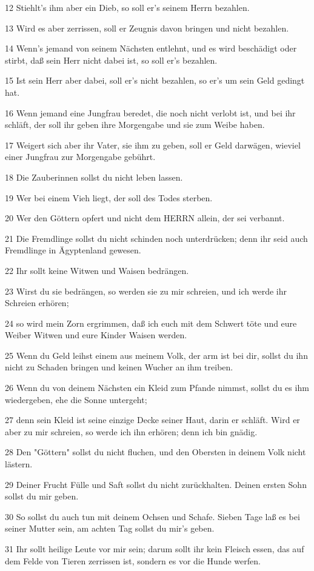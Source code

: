 \par 12 Stiehlt's ihm aber ein Dieb, so soll er's seinem Herrn bezahlen.
\par 13 Wird es aber zerrissen, soll er Zeugnis davon bringen und nicht bezahlen.
\par 14 Wenn's jemand von seinem Nächsten entlehnt, und es wird beschädigt oder stirbt, daß sein Herr nicht dabei ist, so soll er's bezahlen.
\par 15 Ist sein Herr aber dabei, soll er's nicht bezahlen, so er's um sein Geld gedingt hat.
\par 16 Wenn jemand eine Jungfrau beredet, die noch nicht verlobt ist, und bei ihr schläft, der soll ihr geben ihre Morgengabe und sie zum Weibe haben.
\par 17 Weigert sich aber ihr Vater, sie ihm zu geben, soll er Geld darwägen, wieviel einer Jungfrau zur Morgengabe gebührt.
\par 18 Die Zauberinnen sollst du nicht leben lassen.
\par 19 Wer bei einem Vieh liegt, der soll des Todes sterben.
\par 20 Wer den Göttern opfert und nicht dem HERRN allein, der sei verbannt.
\par 21 Die Fremdlinge sollst du nicht schinden noch unterdrücken; denn ihr seid auch Fremdlinge in Ägyptenland gewesen.
\par 22 Ihr sollt keine Witwen und Waisen bedrängen.
\par 23 Wirst du sie bedrängen, so werden sie zu mir schreien, und ich werde ihr Schreien erhören;
\par 24 so wird mein Zorn ergrimmen, daß ich euch mit dem Schwert töte und eure Weiber Witwen und eure Kinder Waisen werden.
\par 25 Wenn du Geld leihst einem aus meinem Volk, der arm ist bei dir, sollst du ihn nicht zu Schaden bringen und keinen Wucher an ihm treiben.
\par 26 Wenn du von deinem Nächsten ein Kleid zum Pfande nimmst, sollst du es ihm wiedergeben, ehe die Sonne untergeht;
\par 27 denn sein Kleid ist seine einzige Decke seiner Haut, darin er schläft. Wird er aber zu mir schreien, so werde ich ihn erhören; denn ich bin gnädig.
\par 28 Den "Göttern" sollst du nicht fluchen, und den Obersten in deinem Volk nicht lästern.
\par 29 Deiner Frucht Fülle und Saft sollst du nicht zurückhalten. Deinen ersten Sohn sollst du mir geben.
\par 30 So sollst du auch tun mit deinem Ochsen und Schafe. Sieben Tage laß es bei seiner Mutter sein, am achten Tag sollst du mir's geben.
\par 31 Ihr sollt heilige Leute vor mir sein; darum sollt ihr kein Fleisch essen, das auf dem Felde von Tieren zerrissen ist, sondern es vor die Hunde werfen.

